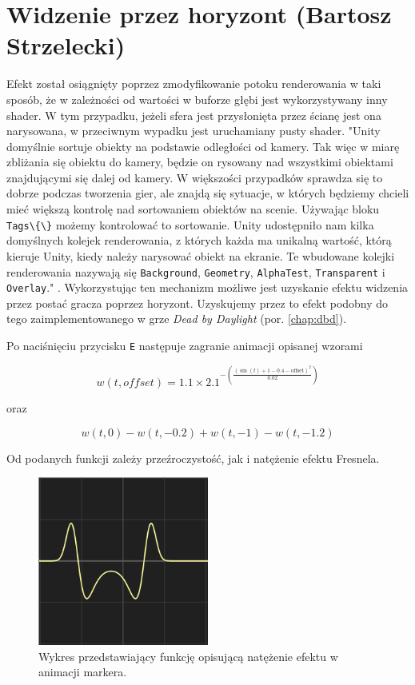 \section{Widzenie przez horyzont (Bartosz Strzelecki)}\label{s:wid_impl}
Efekt został osiągnięty poprzez zmodyfikowanie potoku renderowania w taki sposób, że w zależności od wartości w buforze głębi jest wykorzystywany inny shader.
W tym przypadku, jeżeli sfera jest przysłonięta przez ścianę jest ona narysowana, w przeciwnym wypadku jest uruchamiany pusty shader.
"Unity domyślnie sortuje obiekty na podstawie odległości od kamery. Tak więc
w miarę zbliżania się obiektu do kamery, będzie on rysowany nad wszystkimi obiektami znajdującymi się dalej od kamery.
W większości przypadków sprawdza się to dobrze podczas tworzenia gier, ale
znajdą się sytuacje, w których będziemy chcieli mieć większą kontrolę nad sortowaniem obiektów na scenie. Używając bloku \verb|Tags\{\}| możemy kontrolować to sortowanie.
Unity udostępniło nam kilka domyślnych kolejek renderowania, z których każda ma unikalną wartość, którą
kieruje Unity, kiedy należy narysować obiekt na ekranie. Te wbudowane kolejki renderowania
nazywają się \verb|Background|, \verb|Geometry|, \verb|AlphaTest|, \verb|Transparent| i \verb|Overlay|." \cite{shaderscookbook}. Wykorzystując ten mechanizm
możliwe jest uzyskanie efektu widzenia przez postać gracza poprzez horyzont. Uzyskujemy przez to efekt podobny do tego zaimplementowanego w grze \textit{Dead by Daylight} (por. \ref{chap:dbd}).

Po naciśnięciu przycisku \texttt{E} następuje zagranie animacji opisanej wzorami

\begin{equation}
w(t, offset) = 1.1 \times 2.1^{-\left(\frac{{\left(\sin(t) + 1 - 0.4 - \text{{offset}}\right)^2}}{{0.02}}\right)}
\end{equation}

oraz

\begin{equation}
w(t, 0) - w(t, -0.2) + w(t, -1) - w(t, -1.2)
\end{equation}

Od podanych funkcji zależy przeźroczystość, jak i natężenie efektu Fresnela. 

\begin{figure}[h]
    \centering
    \includegraphics[width=0.5\textwidth]{images/g}
    \caption{Wykres przedstawiający funkcję opisującą natężenie efektu w animacji markera.}
\end{figure}



